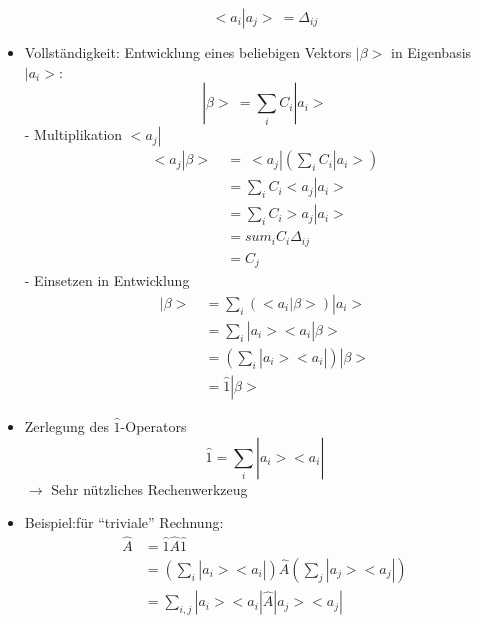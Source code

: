 \documentclass[10pt,article,colorback,accentcolor=tud9d]{scrartcl}
\begin{document}
\begin{fleqn}
\begin{itemize}
\begin{equation}
    <a_i\left.\right|a_j> \ = \Delta_{ij}
    \end{equation}
  \item Vollständigkeit: Entwicklung eines beliebigen Vektors $\left.\right|\beta>$ in Eigenbasis $\left.\right|a_i>$:
    \begin{equation}
    \left.\right|\beta> \ = \sum_i C_i \left.\right|a_i >
    \end{equation}
    - Multiplikation $<a_j\left.\right|$
      \begin{equation}
      \begin{aligned}
      <a_j\left.\right|\beta> \ &= \ <a_j\left.\right|\left(\sum_i C_i\left.\right|a_i>\right)\\
      &=\sum_iC_i<a_j\left.\right|a_i>\\
      &=\sum_i C_i>a_j\left.\right|a_i>\\
      &=sum_iC_i \Delta_{ij}\\
      &=C_j
      \end{aligned}
      \end{equation}
    - Einsetzen in Entwicklung
    \begin{equation}
    \begin{aligned}
      \left.\right|\beta> \ &= \sum_i\left(<a_i\left.\right|\beta>\right) \left.\right|a_i>\\
      &=\sum_i\left.\right|a_i><a_i\left.\right|\beta>\\
      &=\left(\sum_i\left.\right|a_i><a_i\left.\right|\right)\left.\right|\beta>\\
      &=\hat{1}\left.\right|\beta>
    \end{aligned}
    \end{equation}
  \item Zerlegung des $\hat{1}$-Operators
    \begin{equation}
    \hat{1}= \sum_i \left.\right|a_i><a_i\left.\right|
    \end{equation}
    $\rightarrow$ Sehr nützliches Rechenwerkzeug
  \item Beispiel:für "`triviale"' Rechnung:
    \begin{equation}
    \begin{aligned}
    \hat{A} &= \hat{1}\hat{A}\hat{1}\\
    &=\left(\sum_i\left.\right|a_i><a_i\left.\right|\right)\hat{A}\left(\sum_j\left.\right|a_j><a_j\left.\right|\right)\\
    &=\sum_{i,j}\left.\right|a_i><a_i\left.\right|\hat{A}\left.\right|a_j><a_j\left.\right|

\end{aligned}
\end{equation}
\end{itemize}
\end{fleqn}
\end{document}
